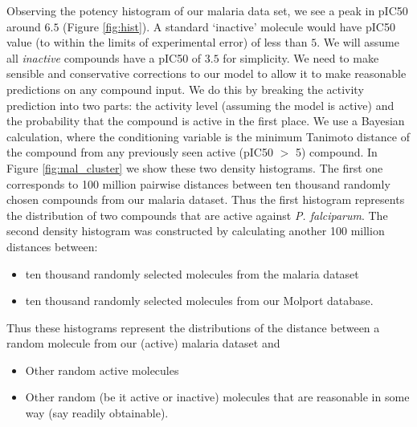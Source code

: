 \documentclass[journal=jacsat,manuscript=article]{achemso}
\begin{document}
Observing the potency histogram of our malaria data set, we see a peak in pIC50 around $6.5$ (Figure \ref{fig:hist}).  A standard `inactive' molecule would have pIC50 value (to within the limits of experimental error) of less than $5$\cite{koutsoukas_2013}.  
We will assume all \textit{inactive} compounds have a pIC50 of $3.5$ for simplicity.
\newline
\newline
We need to make sensible and conservative corrections to our model to allow it to make reasonable predictions on any compound input.  
We do this by breaking the activity prediction into two parts: the activity level (assuming the model is active) and the probability that the compound is active in the first place.  We use a Bayesian calculation, where the conditioning variable is the minimum Tanimoto distance of the compound from any previously seen active (pIC50 $>$ 5) compound.
\newline
\newline
In Figure \ref{fig:mal_cluster} we show these two density histograms. 
The first one corresponds to 100 million pairwise distances between ten thousand randomly chosen compounds from our malaria dataset.  Thus the first histogram represents the distribution of two compounds that are active against {\it P. falciparum}.
The second density histogram was constructed by calculating another 100 million distances between:
\begin{itemize}
    \item ten thousand randomly selected molecules from the malaria dataset
    \item ten thousand randomly selected molecules from our Molport database.
\end{itemize}
Thus these histograms represent the distributions of the distance between a random molecule from our (active) malaria dataset and 
\begin{itemize}
    \item Other random active molecules
    \item Other random (be it active or inactive) molecules that are reasonable in some way (say readily obtainable).
\end{itemize}
\end{document}
